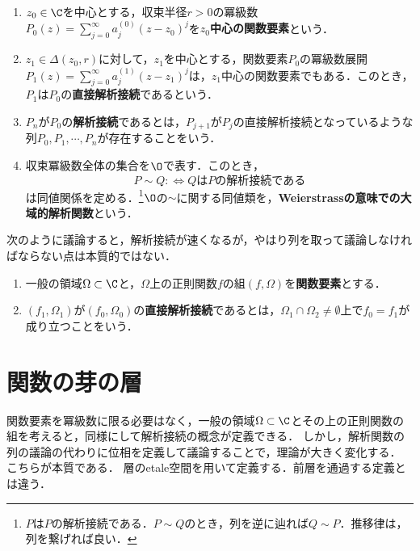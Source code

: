 \documentclass[uplatex, dvipdfmx]{jsreport}
\begin{document}
\begin{definition}\mbox{}
    \begin{enumerate}
        \item $z_0\in\C$を中心とする，収束半径$r>0$の冪級数$P_0(z)=\sum^\infty_{j=0}a_j^{(0)}(z-z_0)^j$を\textbf{$z_0$中心の関数要素}という．
        \item $z_1\in\Delta(z_0,r)$に対して，$z_1$を中心とする，関数要素$P_0$の冪級数展開$P_1(z)=\sum^\infty_{j=0}a_j^{(1)}(z-z_1)^j$は，$z_1$中心の関数要素でもある．このとき，$P_1$は$P_0$の\textbf{直接解析接続}であるという．
        \item $P_n$が$P_0$の\textbf{解析接続}であるとは，$P_{j+1}$が$P_j$の直接解析接続となっているような列$P_0,P_1,\cdots,P_n$が存在することをいう．
        \item 収束冪級数全体の集合を$\O$で表す．このとき，
        \[P\sim Q:\Leftrightarrow QはPの解析接続である\]
        は同値関係を定める．\footnote{$P$は$P$の解析接続である．$P\sim Q$のとき，列を逆に辿れば$Q\sim P$．推移律は，列を繋げれば良い．}$\O$の$\sim$に関する同値類を，\textbf{Weierstrassの意味での大域的解析関数}という．
    \end{enumerate}
\end{definition}

\begin{remark}
    次のように議論すると，解析接続が速くなるが，やはり列を取って議論しなければならない点は本質的ではない．
    \begin{enumerate}
        \item 一般の領域$\Omega\subset\C$と，$\Omega$上の正則関数$f$の組$(f,\Omega)$を\textbf{関数要素}とする．
        \item $(f_1,\Omega_1)$が$(f_0,\Omega_0)$の\textbf{直接解析接続}であるとは，$\Omega_1\cap\Omega_2\ne\emptyset$上で$f_0=f_1$が成り立つことをいう．
    \end{enumerate}
\end{remark}

\section{関数の芽の層}

\begin{tcolorbox}[colframe=ForestGreen, colback=ForestGreen!10!white,breakable,colbacktitle=ForestGreen!40!white,coltitle=black,fonttitle=\bfseries\sffamily,
title=岡潔の霊性]
    関数要素を冪級数に限る必要はなく，一般の領域$\Omega\subset\C$とその上の正則関数の組を考えると，同様にして解析接続の概念が定義できる．
    しかし，解析関数の列の議論の代わりに位相を定義して議論することで，理論が大きく変化する．
    こちらが本質である．
    層のetale空間を用いて定義する．前層を通過する定義とは違う．
\end{tcolorbox}
\end{document}
